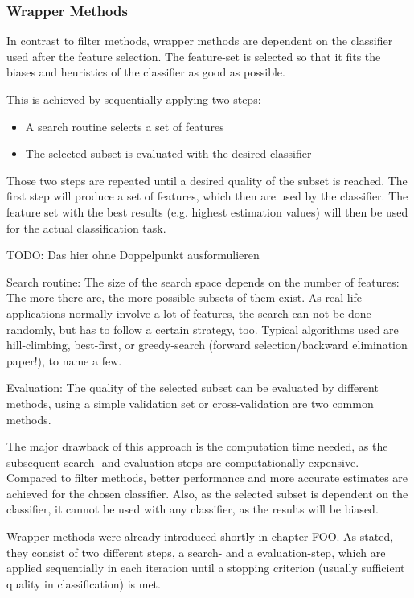 \subsubsection{Wrapper Methods}
\label{sec:methods.flat.wrapper}


In contrast to filter methods, wrapper methods are dependent on the classifier used after the feature selection. 
The feature-set is selected so that it fits the biases and heuristics of the classifier as good as possible. 

This is achieved by sequentially applying two steps: 

\begin{itemize}
  \item A search routine selects a set of features 
  \item The selected subset is evaluated with the desired classifier
\end{itemize}

Those two steps are repeated until a desired quality of the subset is reached. 
The first step will produce a set of features, which then are used by the classifier. 
The feature set with the best results (e.g. highest estimation values) will
then be used for the actual classification task.


TODO: Das hier ohne Doppelpunkt ausformulieren

Search routine:
The size of the search space depends on the number of features: The more there are, the more possible subsets of them exist. 
As real-life applications normally involve a lot of features, the search can not be done randomly, but has to follow a certain strategy, too. 
Typical algorithms used are hill-climbing, best-first, or greedy-search (forward selection/backward elimination paper!), to name a few.

Evaluation:
The quality of the selected subset can be evaluated by different methods, using a simple validation set or cross-validation are two common methods.


The major drawback of this approach is the computation time needed, as the subsequent search- and evaluation steps are computationally expensive. 
Compared to filter methods, better performance and more accurate estimates are achieved for the chosen classifier.
Also, as the selected subset is dependent on the classifier, it cannot be used with any classifier, as the results will be biased.


Wrapper methods were already introduced shortly in chapter FOO. 
As stated, they consist of two different steps, a search- and a evaluation-step, 
which are applied sequentially in each iteration until a stopping criterion (usually sufficient quality in classification) is met.


